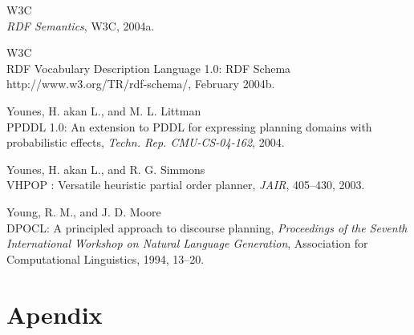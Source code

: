 \documentclass[11pt,a4paper,twoside,openright,titlepage,numbers=noenddot,headinclude,cleardoublepage=empty,openany]{scrreprt}
\theoremstyle{plain}
\theoremstyle{definition}
\theoremstyle{remark}
\begin{document}
\leavevmode\hypertarget{ref-w3c_rdf_2004a}{}%
W3C\\
\emph{RDF Semantics}, W3C, 2004a.

\leavevmode\hypertarget{ref-w3c_rdf_2004}{}%
W3C\\
RDF Vocabulary Description Language 1.0: RDF Schema
http://www.w3.org/TR/rdf-schema/, February 2004b.

\leavevmode\hypertarget{ref-younes_ppddl_2004}{}%
Younes, H. akan L., and M. L. Littman\\
PPDDL 1.0: An extension to PDDL for expressing planning domains with
probabilistic effects, \emph{Techn. Rep. CMU-CS-04-162}, 2004.

\leavevmode\hypertarget{ref-younes_vhpop_2003}{}%
Younes, H. akan L., and R. G. Simmons\\
VHPOP : Versatile heuristic partial order planner, \emph{JAIR},
405--430, 2003.

\leavevmode\hypertarget{ref-young_dpocl_1994}{}%
Young, R. M., and J. D. Moore\\
DPOCL: A principled approach to discourse planning, \emph{Proceedings of
the Seventh International Workshop on Natural Language Generation},
Association for Computational Linguistics, 1994, 13--20.

\hypertarget{apendix}{%
\chapter{Apendix}\label{apendix}}
\end{document}
